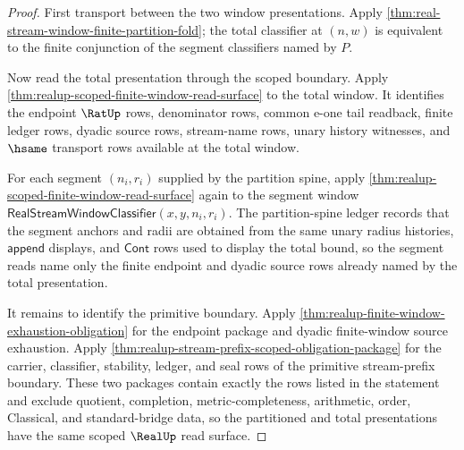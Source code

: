 \begin{proof}
First transport between the two window presentations. Apply
\autoref{thm:real-stream-window-finite-partition-fold}; the total classifier at
$(n,w)$ is equivalent to the finite conjunction of the segment classifiers named
by $P$.

Now read the total presentation through the scoped boundary. Apply
\autoref{thm:realup-scoped-finite-window-read-surface} to the total window. It
identifies the endpoint $\RatUp$ rows, denominator rows, common e-one tail
readback, finite ledger rows, dyadic source rows, stream-name rows, unary
history witnesses, and $\hsame$ transport rows available at the total window.

For each segment $(n_i,r_i)$ supplied by the partition spine, apply
\autoref{thm:realup-scoped-finite-window-read-surface} again to the segment
window $\mathsf{RealStreamWindowClassifier}(x,y,n_i,r_i)$. The partition-spine
ledger records that the segment anchors and radii are obtained from the same
unary radius histories, $\mathsf{append}$ displays, and $\mathsf{Cont}$ rows
used to display the total bound, so the segment reads name only the finite
endpoint and dyadic source rows already named by the total presentation.

It remains to identify the primitive boundary. Apply
\autoref{thm:realup-finite-window-exhaustion-obligation} for the endpoint
package and dyadic finite-window source exhaustion. Apply
\autoref{thm:realup-stream-prefix-scoped-obligation-package} for the carrier,
classifier, stability, ledger, and seal rows of the primitive stream-prefix
boundary. These two packages contain exactly the rows listed in the statement
and exclude quotient, completion, metric-completeness, arithmetic, order,
Classical, and standard-bridge data, so the partitioned and total presentations
have the same scoped $\RealUp$ read surface.
\end{proof}

